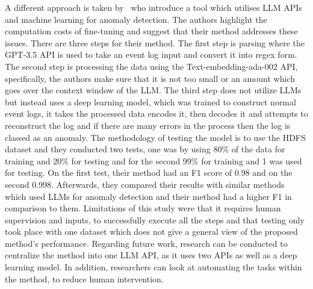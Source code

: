 A different approach is taken by~\cite{fariha2024log} who introduce a tool which utilises LLM APIs and machine learning for anomaly detection. The authors highlight the computation costs of fine-tuning and suggest that their method addresses these issues. There are three steps for their method. The first step is parsing where the GPT-3.5 API is used to take an event log input and convert it into regex form. The second step is processing the data using the Text-embedding-ada-002 API, specifically, the authors make sure that it is not too small or an amount which goes over the context window of the LLM. The third step does not utilize LLMs but instead uses a deep learning model, which was trained to construct normal event logs, it takes the processed data encodes it, then decodes it and attempts to reconstruct the log and if there are many errors in the process then the log is classed as an anomaly. The methodology of testing the model is to use the HDFS dataset and they conducted two tests, one was by using 80\% of the data for training and 20\% for testing and for the second 99\% for training and 1 was used for testing. On the first test, their method had an F1 score of 0.98 and on the second 0.998. Afterwards, they compared their results with similar methods which used LLMs for anomaly detection and their method had a higher F1 in comparison to them. Limitations of this study were that it requires human supervision and inputs, to successfully execute all the steps and that testing only took place with one dataset which does not give a general view of the proposed method’s performance. Regarding future work, research can be conducted to centralize the method into one LLM API, as it uses two APIs as well as a deep learning model. In addition, researchers can look at automating the tasks within the method, to reduce human intervention.

